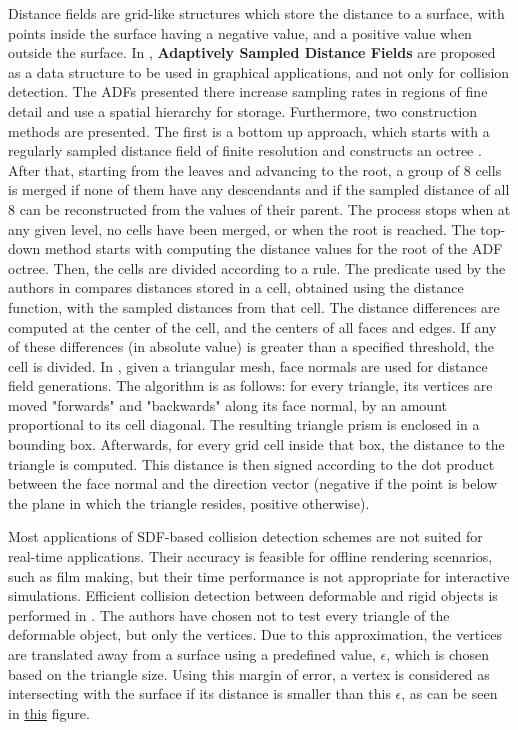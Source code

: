 Distance fields are grid-like structures which store the distance to a surface, with points inside the surface having a negative value, and a positive value when outside the surface. In \citep{fris00}, \textbf{Adaptively Sampled Distance Fields} are proposed as a data structure to be used in graphical applications, and not only for collision detection. The ADFs presented there increase sampling rates in regions of fine detail and use a spatial hierarchy for storage. Furthermore, two construction methods are presented. The first is a bottom up approach, which starts with a regularly sampled distance field of finite resolution and constructs an octree \citep{fris00}. After that, starting from the leaves and advancing to the root, a group of 8 cells is merged if none of them have any descendants and if the sampled distance of all 8 can be reconstructed from the values of their parent. The process stops when at any given level, no cells have been merged, or when the root is reached. The top-down method starts with computing the distance values for the root of the ADF octree. Then, the cells are divided according to a rule. The predicate used by the authors in \citep{fris00} compares distances stored in a cell, obtained using the distance function, with the sampled distances from that cell. The distance differences are computed at the center of the cell, and the centers of all faces and edges. If any of these differences (in absolute value) is greater than a specified threshold, the cell is divided. In \citep{fsg03}, given a triangular mesh, face normals are used for distance field generations. The algorithm is as follows: for every triangle, its vertices are moved "forwards" and "backwards" along its face normal, by an amount proportional to its cell diagonal. The resulting triangle prism is enclosed in a bounding box. Afterwards, for every grid cell inside that box, the distance to the triangle is computed. This distance is then signed according to the dot product between the face normal and the direction vector (negative if the point is below the plane in which the triangle resides, positive otherwise).


Most applications of SDF-based collision detection schemes are not suited for real-time applications. Their accuracy is feasible for offline rendering scenarios, such as film making, but their time performance is not appropriate for interactive simulations. Efficient collision detection between deformable and rigid objects is performed in \citep{fsg03}. The authors have chosen not to test every triangle of the deformable object, but only the vertices. Due to this approximation, the vertices are translated away from a surface using a predefined value, $\epsilon$, which is chosen based on the triangle size. Using this margin of error, a vertex is considered as intersecting with the surface if its distance is smaller than this $\epsilon$, as can be seen in \hyperref[img:sdf-eps]{this} figure.




